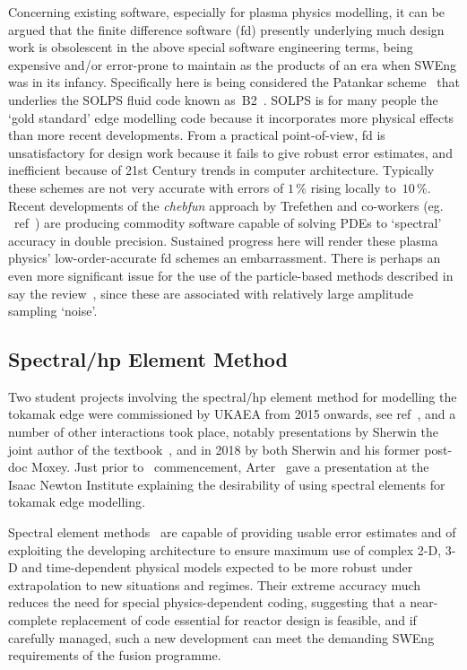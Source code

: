 Concerning existing software, especially for plasma physics modelling, it can be argued that 
the finite difference software (fd) presently underlying much design work is obsolescent in the above
special software engineering terms, being expensive and/or error-prone to maintain as the products of an era when
SWEng was in its infancy. Specifically here is being considered the Patankar scheme~\cite{patankar}
that underlies the SOLPS fluid code known as~B2~\cite[\S\,6]{braams}. SOLPS is for many people
the `gold standard' edge modelling code because it incorporates more physical effects than
more recent developments.
From a practical point-of-view, fd is unsatisfactory for design work because it
fails to give robust error estimates, and inefficient because of
21st Century trends in computer architecture. %
Typically these schemes are not very accurate with errors of $1$\,\% rising locally to~$10$\,\%.
Recent developments of the \emph{chebfun} approach by Trefethen and co-workers (eg. \ ref~\cite{To15Cont,Ha17Cheb})
are producing
commodity software capable of solving PDEs to `spectral' accuracy in double precision.
Sustained progress here will render these plasma physics' low-order-accurate fd schemes an embarrassment.
There is perhaps an even more significant issue for the use of the particle-based
methods described in say the review~\cite{Wa95a}, since these are associated
with relatively large amplitude sampling `noise'.

\subsection{Spectral/hp Element Method}\label{sec:spem}
Two student projects involving the spectral/hp element method for modelling
the tokamak edge were commissioned by UKAEA from 2015 onwards, see ref~\cite{Ca15Appl, bhojwani},
and a number of other interactions took place, notably presentations by Sherwin
the joint author of the textbook~\cite{karniadakissherwin},
and in 2018 by both Sherwin and his former post-doc Moxey. Just prior to
\nep \ commencement, Arter~\cite{Ar19Chal-ppt} gave a 
presentation at the Isaac Newton Institute explaining the desirability of using
spectral elements for tokamak edge modelling.

Spectral element methods~\cite{pozrikidis} are capable of providing usable error
estimates and of exploiting the
developing architecture to ensure maximum use of complex 2-D, 3-D 
and time-dependent physical models expected to be more robust under 
extrapolation to new situations and regimes. Their extreme accuracy much reduces the need for
special physics-dependent coding, suggesting that a near-complete replacement of code essential
for reactor design is feasible, and if carefully managed, such a new development can meet the
demanding SWEng requirements of the fusion programme.

